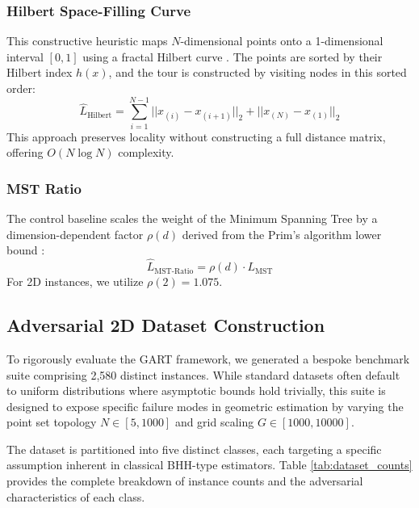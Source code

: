 \documentclass{article}
\begin{document}
\subsubsection{Hilbert Space-Filling Curve}
This constructive heuristic maps $N$-dimensional points onto a 1-dimensional interval $[0, 1]$ using a fractal Hilbert curve \citep{bartholdi1982heuristic}. The points are sorted by their Hilbert index $h(x)$, and the tour is constructed by visiting nodes in this sorted order:
\begin{equation}
    \hat{L}_{\text{Hilbert}} = \sum_{i=1}^{N-1} ||x_{(i)} - x_{(i+1)}||_2 + ||x_{(N)} - x_{(1)}||_2
\end{equation}
This approach preserves locality without constructing a full distance matrix, offering $O(N \log N)$ complexity.

\subsubsection{MST Ratio}
The control baseline scales the weight of the Minimum Spanning Tree by a dimension-dependent factor $\rho(d)$ derived from the Prim's algorithm lower bound \citep{prim1957}:
\begin{equation}
    \hat{L}_{\text{MST-Ratio}} = \rho(d) \cdot L_{\text{MST}}
\end{equation}
For 2D instances, we utilize $\rho(2) = 1.075$.

\subsection{Adversarial 2D Dataset Construction} \label{subsec:dataset_construction}

To rigorously evaluate the GART framework, we generated a bespoke benchmark suite comprising 2,580 distinct instances. While standard datasets often default to uniform distributions where asymptotic bounds hold trivially, this suite is designed to expose specific failure modes in geometric estimation by varying the point set topology $N \in [5, 1000]$ and grid scaling $G \in [1000, 10000]$.

The dataset is partitioned into five distinct classes, each targeting a specific assumption inherent in classical BHH-type estimators. Table \ref{tab:dataset_counts} provides the complete breakdown of instance counts and the adversarial characteristics of each class.
\end{document}
